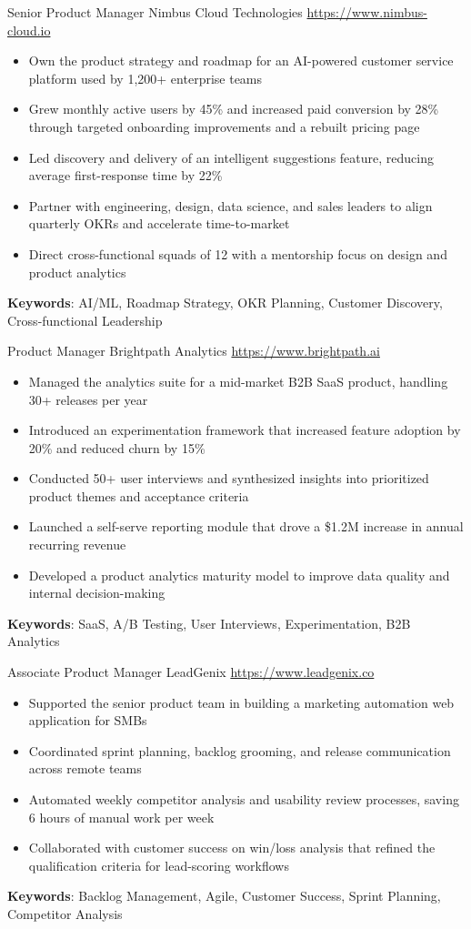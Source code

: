 \documentclass[a4paper, serif, 10pt]{moderncv}
\begin{document}
        {Senior Product Manager}
        {Nimbus Cloud Technologies}
        {\url{https://www.nimbus-cloud.io}}
        {}
        {\begin{itemize}
\item Own the product strategy and roadmap for an AI-powered customer service platform used by 1,200+ enterprise teams
\item Grew monthly active users by 45\% and increased paid conversion by 28\% through targeted onboarding improvements and a rebuilt pricing page
\item Led discovery and delivery of an intelligent suggestions feature, reducing average first-response time by 22\%
\item Partner with engineering, design, data science, and sales leaders to align quarterly OKRs and accelerate time-to-market
\item Direct cross-functional squads of 12 with a mentorship focus on design and product analytics
\end{itemize}
\textbf{Keywords}: AI/ML, Roadmap Strategy, OKR Planning, Customer Discovery, Cross-functional Leadership}

        {Product Manager}
        {Brightpath Analytics}
        {\url{https://www.brightpath.ai}}
        {}
        {\begin{itemize}
\item Managed the analytics suite for a mid-market B2B SaaS product, handling 30+ releases per year
\item Introduced an experimentation framework that increased feature adoption by 20\% and reduced churn by 15\%
\item Conducted 50+ user interviews and synthesized insights into prioritized product themes and acceptance criteria
\item Launched a self-serve reporting module that drove a \$1.2M increase in annual recurring revenue
\item Developed a product analytics maturity model to improve data quality and internal decision-making
\end{itemize}
\textbf{Keywords}: SaaS, A/B Testing, User Interviews, Experimentation, B2B Analytics}

        {Associate Product Manager}
        {LeadGenix}
        {\url{https://www.leadgenix.co}}
        {}
        {\begin{itemize}
\item Supported the senior product team in building a marketing automation web application for SMBs
\item Coordinated sprint planning, backlog grooming, and release communication across remote teams
\item Automated weekly competitor analysis and usability review processes, saving 6 hours of manual work per week
\item Collaborated with customer success on win/loss analysis that refined the qualification criteria for lead-scoring workflows
\end{itemize}
\textbf{Keywords}: Backlog Management, Agile, Customer Success, Sprint Planning, Competitor Analysis}
\end{document}
